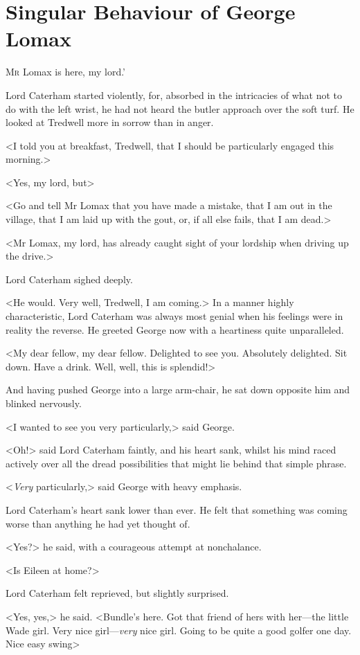 \chapter{Singular Behaviour of George Lomax}

\lettrine[ante=`]{M}{r}  Lomax is here, my lord.'

\zz
Lord Caterham started violently, for, absorbed in the intricacies of what not to do with the left wrist, he had not heard the butler approach over the soft turf. He looked at Tredwell more in sorrow than in anger.

<I told you at breakfast, Tredwell, that I should be particularly engaged this morning.>

<Yes, my lord, but\longdash>

<Go and tell Mr Lomax that you have made a mistake, that I am out in the village, that I am laid up with the gout, or, if all else fails, that I am dead.>

<Mr Lomax, my lord, has already caught sight of your lordship when driving up the drive.>

Lord Caterham sighed deeply.

<He would. Very well, Tredwell, I am coming.> In a manner highly characteristic, Lord Caterham was always most genial when his feelings were in reality the reverse. He greeted George now with a heartiness quite unparalleled.

<My dear fellow, my dear fellow. Delighted to see you. Absolutely delighted. Sit down. Have a drink. Well, well, this is splendid!>

And having pushed George into a large arm-chair, he sat down opposite him and blinked nervously.

<I wanted to see you very particularly,> said George.

<Oh!> said Lord Caterham faintly, and his heart sank, whilst his mind raced actively over all the dread possibilities that might lie behind that simple phrase.

<\emph{Very} particularly,> said George with heavy emphasis.

Lord Caterham's heart sank lower than ever. He felt that something was coming worse than anything he had yet thought of.

<Yes?> he said, with a courageous attempt at nonchalance.

<Is Eileen at home?>

Lord Caterham felt reprieved, but slightly surprised.

<Yes, yes,> he said. <Bundle's here. Got that friend of hers with her—the little Wade girl. Very nice girl—\emph{very} nice girl. Going to be quite a good golfer one day. Nice easy swing\longdash>


